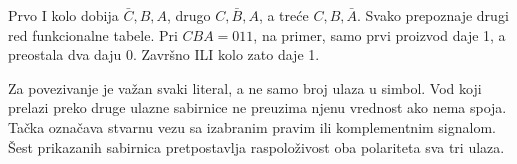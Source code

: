 
Prvo I kolo dobija \(\bar C,B,A\), drugo \(C,\bar B,A\), a treće \(C,B,\bar A\). Svako prepoznaje drugi red funkcionalne tabele. Pri \(CBA=011\), na primer, samo prvi proizvod daje 1, a preostala dva daju 0. Završno ILI kolo zato daje 1.

Za povezivanje je važan svaki literal, a ne samo broj ulaza u simbol. Vod koji prelazi preko druge ulazne sabirnice ne preuzima njenu vrednost ako nema spoja. Tačka označava stvarnu vezu sa izabranim pravim ili komplementnim signalom. Šest prikazanih sabirnica pretpostavlja raspoloživost oba polariteta sva tri ulaza.
